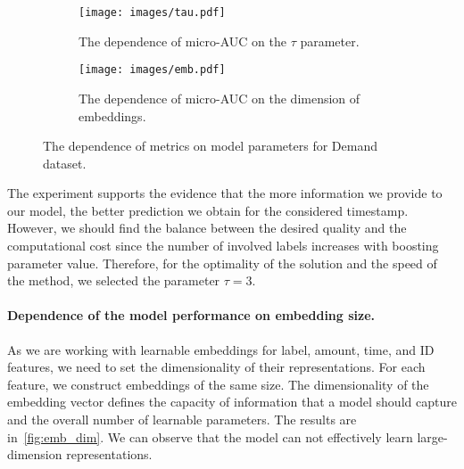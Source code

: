 \documentclass[runningheads]{llncs}
\begin{document}
\begin{figure}[h!]
     \centering
     \begin{subfigure}[b]{0.47\textwidth}
         \centering
         \texttt{[image: images/tau.pdf]}
         \caption{The dependence of micro-AUC on the \textit{$\tau$} parameter.}
         \label{fig:look_back}
     \end{subfigure}
     \hfill
     \begin{subfigure}[b]{0.47\textwidth}
         \centering
         \texttt{[image: images/emb.pdf]}
         \caption{The dependence of micro-AUC on the dimension of embeddings.}
         \label{fig:emb_dim}
     \end{subfigure}
    \caption{The dependence of metrics on model parameters for Demand dataset.}
\end{figure}

The experiment supports the evidence that the more information we provide to our model, the better prediction we obtain for the considered timestamp. 
However, we should find the balance between the desired quality and the computational cost since the number of involved labels increases with boosting parameter value. Therefore, for the optimality of the solution and the speed of the method, we selected the parameter $\tau = 3$.

\paragraph{\textbf{Dependence of the model performance on embedding size.}}
As we are working with learnable embeddings for label, amount, time, and ID features, we need to set the dimensionality of their representations. For each feature, we construct embeddings of the same size. The dimensionality of the embedding vector defines the capacity of information that a model should capture and the overall number of learnable parameters. The results are in~\autoref{fig:emb_dim}. We can observe that the model can not effectively learn large-dimension representations.

\end{document}
